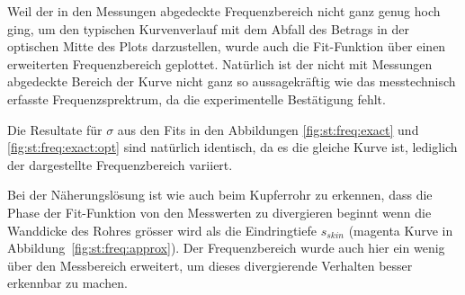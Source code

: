 {\begin{minipage}[t]{0.33\textwidth}
        \vspace{1em}

        Weil  der  in  den  Messungen abgedeckte  Frequenzbereich  nicht  ganz
        genug hoch  ging, um  den   typischen    Kurvenverlauf mit  dem Abfall
        des  Betrags in  der  optischen Mitte  des  Plots darzustellen,  wurde
        auch  die   Fit-Funktion  \"uber  einen   erweiterten  Frequenzbereich
        geplottet. Nat\"urlich ist der nicht  mit Messungen abgedeckte Bereich
        der  Kurve  nicht  ganz  so  aussagekr\"aftig  wie  das  messtechnisch
        erfasste Frequenzsprektrum, da die experimentelle Best\"atigung fehlt.

        Die    Resultate    f\"ur   $\sigma$    aus    den    Fits   in    den
        Abbildungen  \ref{fig:st:freq:exact}  und  \ref{fig:st:freq:exact:opt}
        sind nat\"urlich identisch, da es die gleiche Kurve ist, lediglich der
        dargestellte Frequenzbereich variiert.
	\end{minipage}%
	\begin{minipage}[t]{0.67\textwidth}
        \vspace{0pt}
        \resizebox{.95\textwidth}{!}{}
        \label{fig:st:freq:exact:opt}
	\end{minipage}

	\begin{minipage}[t]{0.33\textwidth}
        \vspace{0pt}
        Bei  der   N\"aherungsl\"osung  ist   wie  auch  beim   Kupferrohr  zu
        erkennen,  dass   die  Phase  der  Fit-Funktion   von  den  Messwerten
        zu  divergieren  beginnt   wenn  die Wanddicke  des  Rohres  gr\"osser
        wird    als   die   Eindringtiefe   $s_{skin}$   (magenta   Kurve   in
        Abbildung~\ref{fig:st:freq:approx}). Der  Frequenzbereich  wurde  auch
        hier   ein  wenig   \"uber  den   Messbereich  erweitert,   um  dieses
        divergierende Verhalten besser erkennbar zu machen.
        \vspace{1em}
        
	\end{minipage}%
	\begin{minipage}[t]{0.67\textwidth}
        \vspace{0pt}
        \resizebox{.95\textwidth}{!}{}
        \label{fig:st:freq:approx}
	\end{minipage}


}
